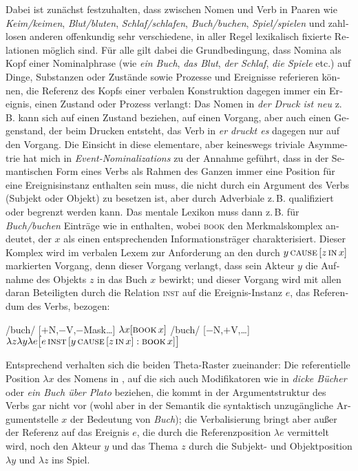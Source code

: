 \documentclass[output=paper,colorlinks,citecolor=brown]{langscibook}
\begin{document}
\begin{otherlanguage}{german}
\noindent Dabei ist zunächst festzuhalten, dass zwischen Nomen und Verb in Paaren wie \textit{Keim/keimen}, \textit{Blut/bluten}, \textit{Schlaf/schlafen}, \textit{Buch/buchen}, \textit{Spiel/spielen} und zahllosen anderen offenkundig sehr verschiedene, in aller Regel lexikalisch fixierte Relationen möglich sind. Für alle gilt dabei die Grundbedingung, dass Nomina als Kopf einer Nominalphrase (wie \textit{ein Buch}, \textit{das Blut}, \textit{der Schlaf}, \textit{die Spiele} etc.) auf Dinge, Substanzen oder Zustände sowie Prozesse und Ereignisse referieren können, die Referenz des Kopfs einer verbalen Konstruktion dagegen immer ein Ereignis, einen Zustand oder Prozess verlangt: Das Nomen in \textit{der Druck ist neu} z.\,B. kann sich auf einen Zustand beziehen, auf einen Vorgang, aber auch einen Gegenstand, der beim Drucken entsteht, das Verb in \textit{er druckt es} dagegen nur auf den Vorgang. Die Einsicht in diese elementare, aber keineswegs triviale Asymmetrie hat mich in \textit{Event-Nominalizations} \citep{Bierwisch1990} zu der Annahme geführt, dass in der Semantischen Form eines Verbs als Rahmen des Ganzen immer eine Position für eine Ereignisinstanz enthalten sein muss, die nicht durch ein Argument des Verbs (Subjekt oder Objekt) zu besetzen ist, aber durch Adverbiale z.\,B. qualifiziert oder begrenzt werden kann. Das mentale Lexikon muss dann z.\,B. für \textit{Buch/buchen} Einträge wie in  enthalten, wobei \textsc{book} den Merkmalskomplex andeutet, der $x$ als einen entsprechenden Informationsträger charakterisiert. Dieser Komplex wird im verbalen Lexem  zur Anforderung an den durch $y\, \textsc{cause}\, [ z\, \textsc{in}\, x ]$ markierten Vorgang, denn dieser Vorgang verlangt, dass sein Akteur $y$ die Aufnahme des Objekts $z$ in das Buch $x$ bewirkt; und dieser Vorgang wird mit allen daran Beteiligten durch die Relation \textsc{inst} auf die Ereignis-Instanz $e$, das Referendum des Verbs, bezogen:

\ea
\ea /buch/ [$+$N,$-$V,$-$Mask\dots] $\lambda x [ \textsc{book}\, x ]$
\label{ex:13a}
\ex /buch/ [$-$N,$+$V,\dots]\phantom{rask\ldots]} $\lambda z \lambda y \lambda e \big\lbrack e\, \textsc{inst}\, [ y\, \textsc{cause}\, [ z\, \textsc{in}\, x ] : \textsc{book}\, x ]\big\rbrack$
\label{ex:13b}
\z
\label{ex:13}
\z 

\noindent Entsprechend verhalten sich die beiden Theta-Raster zueinander: Die re\-fe\-ren\-tiel\-le Position $\lambda x$ des Nomens in , auf die sich auch Modifikatoren wie in \textit{dicke Bücher} oder \textit{ein Buch über Plato} beziehen, die kommt in der Argumentstruktur des Verbs gar nicht vor (wohl aber in der Semantik die syntaktisch unzugängliche Argumentstelle $x$ der Bedeutung von \textit{Buch}); die Verbalisierung bringt aber außer der Referenz auf das Ereignis $e$, die durch die Referenzposition $\lambda e$ vermittelt wird, noch den Akteur $y$ und das Thema $z$ durch die Subjekt- und Objektposition $\lambda y$ und $\lambda z$ ins Spiel.


\end{otherlanguage}
\end{document}
